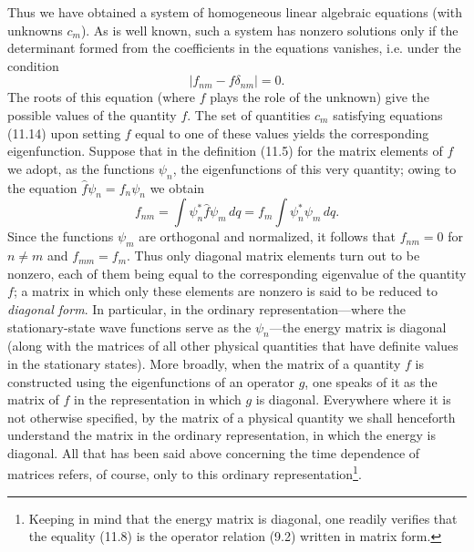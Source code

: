 Thus we have obtained a system of homogeneous linear algebraic equations (with
unknowns $c_m$). As is well known, such a system has nonzero solutions only
if the determinant formed from the coefficients in the equations vanishes, i.e.
under the condition
\begin{equation}
  |f_{nm}-f\delta_{nm}|=0.
  \tag{11.15}
\end{equation}
The roots of this equation (where $f$ plays the role of the unknown) give
the possible values of the quantity $f$. The set of quantities $c_m$ satisfying
equations (11.14) upon setting $f$ equal to one of these values yields the
corresponding eigenfunction.
Suppose that in the definition (11.5) for the matrix elements of $f$ we adopt,
as the functions $\psi_n$, the eigenfunctions of this very quantity; owing to the
equation $\hat f\psi_n=f_n\psi_n$ we obtain
\[
 f_{nm}=\int\psi_n^*\hat f\psi_m\,dq
 =f_m\int\psi_n^*\psi_m\,dq.
\]
Since the functions $\psi_m$ are orthogonal and normalized,
it follows that $f_{nm}=0$ for $n\ne m$ and $f_{mm}=f_m$. Thus only diagonal matrix
elements turn out to be nonzero, each of them being equal to the corresponding
eigenvalue of the quantity $f$; a matrix in which only these elements are
nonzero is said to be reduced to \textit{diagonal form}. In particular, in the
ordinary representation---where the stationary-state wave functions serve
as the $\psi_n$---the energy matrix is diagonal (along with the matrices of
all other physical quantities that have definite values in the stationary
states). More broadly, when the matrix of a quantity $f$ is constructed using
the eigenfunctions of an operator $g$, one speaks of it as the matrix of $f$ in the
representation in which $g$ is diagonal. Everywhere where it is not otherwise
specified, by the matrix of a physical quantity we shall henceforth understand
the matrix in the ordinary representation, in which the energy is diagonal.
All that has been said above concerning the time dependence of matrices refers,
of course, only to this ordinary representation\footnote{Keeping in mind that
the energy matrix is diagonal, one readily verifies that the equality (11.8) is
the operator relation (9.2) written in matrix form.}.


